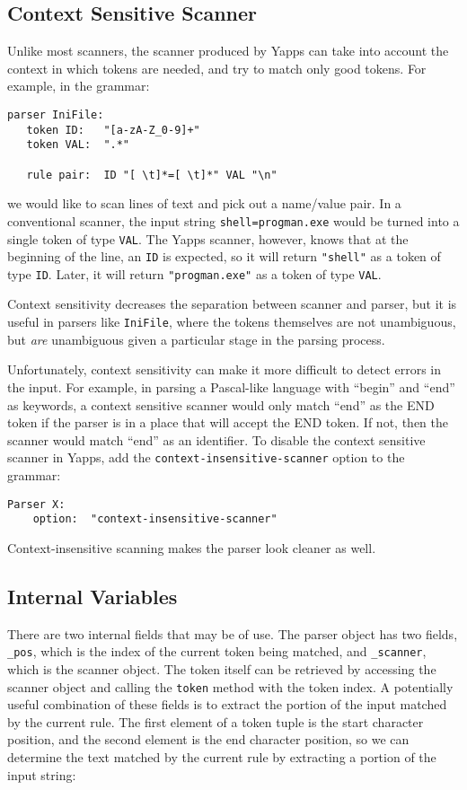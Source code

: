 \documentclass[10pt]{article}
\newcommand{\mysubsection}[1]{\subsection{\textcolor{darkerblue}{#1}}}
\begin{document}
\mysubsection{Context Sensitive Scanner}

Unlike most scanners, the scanner produced by Yapps can take into
account the context in which tokens are needed, and try to match only
good tokens.  For example, in the grammar:

\begin{verbatim}
parser IniFile:
   token ID:   "[a-zA-Z_0-9]+"
   token VAL:  ".*"

   rule pair:  ID "[ \t]*=[ \t]*" VAL "\n"
\end{verbatim}

we would like to scan lines of text and pick out a name/value pair.
In a conventional scanner, the input string \texttt{shell=progman.exe}
would be turned into a single token of type \texttt{VAL}.  The Yapps
scanner, however, knows that at the beginning of the line, an
\texttt{ID} is expected, so it will return \texttt{"shell"} as a token
of type \texttt{ID}.  Later, it will return \texttt{"progman.exe"} as
a token of type \texttt{VAL}.

Context sensitivity decreases the separation between scanner and
parser, but it is useful in parsers like \texttt{IniFile}, where the
tokens themselves are not unambiguous, but \emph{are} unambiguous
given a particular stage in the parsing process.

Unfortunately, context sensitivity can make it more difficult to
detect errors in the input.  For example, in parsing a Pascal-like
language with ``begin'' and ``end'' as keywords, a context sensitive
scanner would only match ``end'' as the END token if the parser is in
a place that will accept the END token.  If not, then the scanner
would match ``end'' as an identifier.  To disable the context
sensitive scanner in Yapps, add the
\texttt{context-insensitive-scanner} option to the grammar:

\begin{verbatim}
Parser X:
    option:  "context-insensitive-scanner"
\end{verbatim}

Context-insensitive scanning makes the parser look cleaner as well.

\mysubsection{Internal Variables}

There are two internal fields that may be of use.  The parser object
has two fields, \texttt{\_pos}, which is the index of the current
token being matched, and \texttt{\_scanner}, which is the scanner
object.  The token itself can be retrieved by accessing the scanner
object and calling the \texttt{token} method with the token index.  A
potentially useful combination of these fields is to extract the
portion of the input matched by the current rule.  The first element
of a token tuple is the start character position, and the second
element is the end character position, so we can determine the text
matched by the current rule by extracting a portion of the input
string:
\end{document}
